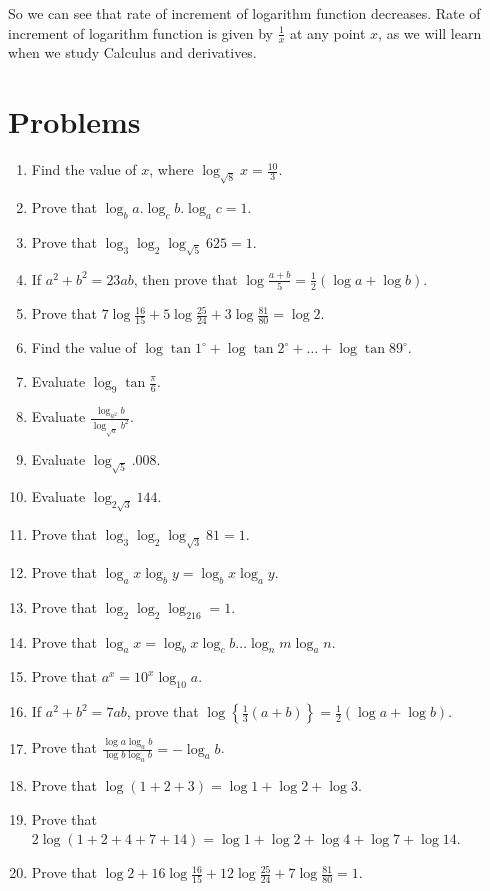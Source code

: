 So we can see that rate of increment of logarithm function decreases. Rate of increment of logarithm function is given by
$\frac{1}{x}$ at any point $x$, as we will learn when we study Calculus and derivatives.

\section{Problems}
\begin{enumerate}
\item Find the value of $x$, where $\log_{\sqrt{8}} x = \frac{10}{3}$.
\item Prove that $\log_ba.\log_cb.\log_ac = 1$.
\item Prove that $\log_3\log_2\log_{\sqrt{5}}625 = 1$.
\item If $a^2 + b^2 = 23ab$, then prove that $\log\tfrac{a + b}{5} = \frac{1}{2}(\log a + \log b)$.
\item Prove that $7\log\frac{16}{15} + 5\log\frac{25}{24} + 3\log\frac{81}{80} = \log 2$.
\item Find the value of $\log\tan1^\circ + \log\tan2^\circ + \ldots + \log\tan89^\circ$.
\item Evaluate $\log_9\tan\frac{\pi}{6}$.
\item Evaluate $\frac{\log_{a^2}b}{\log_{\sqrt{a}}b^2}$.
\item Evaluate $\log_{\sqrt{5}}.008$.
\item Evaluate $\log_{2\sqrt{3}}144$.
\item Prove that $\log_3\log_2\log_{\sqrt{3}}81 = 1$.
\item Prove that $\log_ax\log_by = \log_bx\log_ay$.
\item Prove that $\log_2\log_2\log_216 = 1$.
\item Prove that $\log_ax = \log_bx\log_cb\ldots\log_nm\log_an$.
\item Prove that $a^x = 10^x\log_{10}a$.
\item If $a^2 + b^2 = 7ab$, prove that $\log\left\{\tfrac{1}{3}(a + b)\right\} = \frac{1}{2}(\log a + \log b)$.
\item Prove that $\frac{\log a\log_ab}{\log b\log_ab} = -\log_ab$.
\item Prove that $\log(1 + 2 + 3) = \log 1 + \log 2 + \log 3$.
\item Prove that $2\log(1 + 2 + 4 + 7 + 14) = \log 1 + \log 2 + \log 4 + \log 7 + \log 14$.
\item Prove that $\log 2 + 16\log\frac{16}{15} + 12\log\frac{25}{24} + 7\log\frac{81}{80} = 1$.

\end{enumerate}
